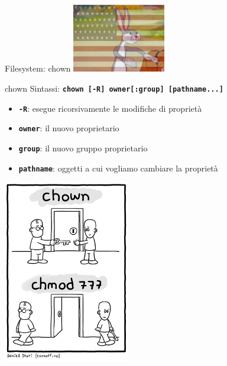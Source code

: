 \documentclass{beamer}
\begin{document}
    \begin{frame}{Filesystem: chown}
        \centering
        \includegraphics[height=3cm, keepaspectratio]{images/bugs-bunny-capitalist.png}
        \begin{block}{chown}
            Sintassi: \texttt{\textbf{chown [-R] owner[:group] [pathname...]}}

            \begin{itemize}
                \item \texttt{\textbf{-R}}: esegue ricorsivamente le modifiche di proprietà
                \item \texttt{\textbf{owner}}: il nuovo proprietario
                \item \texttt{\textbf{group}}: il nuovo gruppo proprietario
                \item \texttt{\textbf{pathname}}: oggetti a cui vogliamo cambiare la proprietà
            \end{itemize}
        \end{block}
    \end{frame}

    \begin{frame}{}
        \centering
        \includegraphics[height=8cm, keepaspectratio]{images/chown-chmod.png}
    \end{frame}
\end{document}
